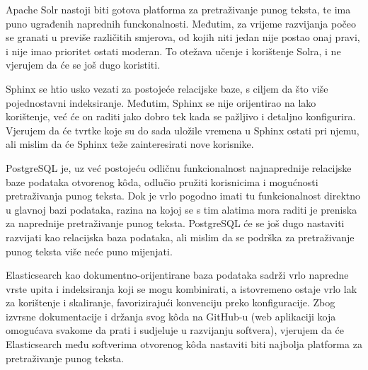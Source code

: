 \documentclass[a4paper,twoside,12pt]{scrreprt}
\begin{document}
Apache Solr nastoji biti gotova platforma za pretraživanje punog teksta, te ima puno ugrađenih naprednih funckonalnosti. Međutim, za vrijeme razvijanja počeo se granati u previše različitih smjerova, od kojih niti jedan nije postao onaj pravi, i nije imao prioritet ostati moderan. To otežava učenje i korištenje Solra, i ne vjerujem da će se još dugo koristiti.

Sphinx se htio usko vezati za postojeće relacijske baze, s ciljem da što više pojednostavni indeksiranje. Međutim, Sphinx se nije orijentirao na lako korištenje, već će on raditi jako dobro tek kada se pažljivo i detaljno konfigurira. Vjerujem da će tvrtke koje su do sada uložile vremena u Sphinx ostati pri njemu, ali mislim da će Sphinx teže zainteresirati nove korisnike.

PostgreSQL je, uz već postojeću odličnu funkcionalnost najnaprednije relacijske baze podataka otvorenog kôda, odlučio pružiti korisnicima i mogućnosti pretraživanja punog teksta. Dok je vrlo pogodno imati tu funkcionalnost direktno u glavnoj bazi podataka, razina na kojoj se s tim alatima mora raditi je preniska za naprednije pretraživanje punog teksta. PostgreSQL će se još dugo nastaviti razvijati kao relacijska baza podataka, ali mislim da se podrška za pretraživanje punog teksta više neće puno mijenjati.

Elasticsearch kao dokumentno-orijentirane baza podataka sadrži vrlo napredne vrste upita i indeksiranja koji se mogu kombinirati, a istovremeno ostaje vrlo lak za korištenje i skaliranje, favorizirajući konvenciju preko konfiguracije. Zbog izvrsne dokumentacije i držanja svog kôda na GitHub-u (web aplikaciji koja omogućava svakome da prati i sudjeluje u razvijanju softvera), vjerujem da će Elasticsearch među softverima otvorenog kôda nastaviti biti najbolja platforma za pretraživanje punog teksta.
\end{document}
